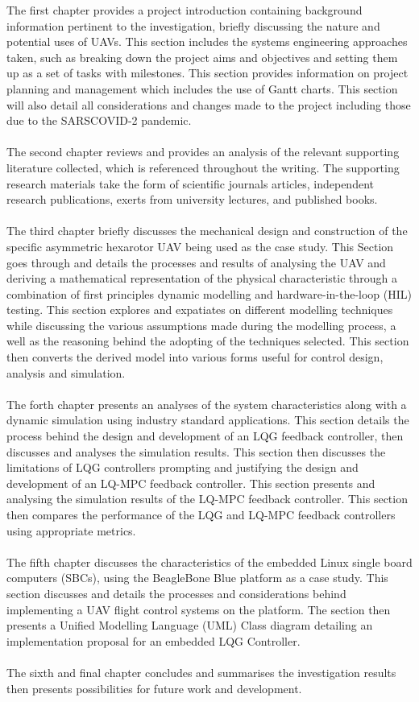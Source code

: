 \documentclass[12pt,a4paper,twoside]{report}
\begin{document}
		The first chapter provides a project introduction containing background information pertinent to the investigation, briefly discussing the nature and potential uses of UAVs. This section includes the systems engineering approaches taken, such as breaking down the project aims and objectives and setting them up as a set of tasks with milestones. This section provides information on project planning and management which includes the use of Gantt charts. This section will also detail all considerations and changes made to the project including those due to the SARSCOVID-2 pandemic.
		\\ \\
		The second chapter reviews and provides an analysis of the relevant supporting literature collected, which is referenced throughout the writing. The supporting research materials take the form of scientific journals articles, independent research publications, exerts from university lectures, and published books.
		\\ \\
		The third chapter briefly discusses the mechanical design and construction of the specific asymmetric hexarotor UAV being used as the case study. This Section goes through and details the processes and results of analysing the UAV and deriving a mathematical representation of the physical characteristic through a combination of first principles dynamic modelling and hardware-in-the-loop (HIL) testing. This section explores and expatiates on different modelling techniques while discussing the various assumptions made during the modelling process, a well as the reasoning behind the adopting of the techniques selected. This section then converts the derived model into various forms useful for control design, analysis and simulation.
		\\ \\
		The forth chapter presents an analyses of the system characteristics along with a dynamic simulation using industry standard applications. This section details the process behind the design and development of an LQG feedback controller, then discusses and analyses the simulation results. This section then discusses the limitations of LQG controllers prompting and justifying the design and development of an LQ-MPC feedback controller. This section presents and analysing the simulation results of the LQ-MPC feedback controller. This section then compares the performance of the LQG and LQ-MPC feedback controllers using appropriate metrics.
		\\ \\
		The fifth chapter discusses the characteristics of the embedded Linux single board computers (SBCs), using the BeagleBone Blue platform as a case study. This section discusses and details the processes and considerations behind implementing a UAV flight control systems on the platform. The section then presents a Unified Modelling Language (UML) Class diagram detailing an implementation proposal for an embedded LQG Controller.
		\\ \\
		The sixth and final chapter concludes and summarises the investigation results then presents possibilities for future work and development.
		
\end{document}
